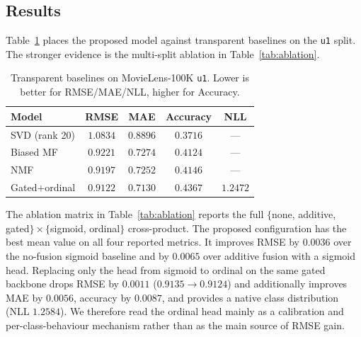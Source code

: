 \documentclass[a4paper]{article} %
\begin{document}
\subsection{Results}
Table~\ref{tab:baselines} places the proposed model against transparent
baselines on the \texttt{u1} split. The stronger evidence is the multi-split
ablation in Table~\ref{tab:ablation}.

\begin{table}[ht]
\centering
\caption{Transparent baselines on MovieLens-100K \texttt{u1}. Lower is better
for RMSE/MAE/NLL, higher for Accuracy.}
\label{tab:baselines}
\begin{tabular}{lcccc}
\toprule
Model & RMSE & MAE & Accuracy & NLL \\
\midrule
SVD (rank 20) & $1.0834$ & $0.8896$ & $0.3716$ & --- \\
Biased MF & $0.9221$ & $0.7274$ & $0.4124$ & --- \\
NMF & $0.9197$ & $0.7252$ & $0.4146$ & --- \\
Gated$+$ordinal & $\mathbf{0.9122}$ & $\mathbf{0.7130}$ & $\mathbf{0.4367}$ & $\mathbf{1.2472}$ \\
\bottomrule
\end{tabular}
\end{table}

The ablation matrix in Table~\ref{tab:ablation} reports the full
$\{$none, additive, gated$\}\times\{$sigmoid, ordinal$\}$ cross-product. The
proposed configuration has the best mean value on all four reported metrics. It
improves RMSE by $0.0036$ over the no-fusion sigmoid baseline and by $0.0065$
over additive fusion with a sigmoid head. Replacing only the head from sigmoid
to ordinal on the same gated backbone drops RMSE by $0.0011$ ($0.9135\to0.9124$)
and additionally improves MAE by $0.0056$, accuracy by $0.0087$, and provides
a native class distribution (NLL $1.2584$). We therefore read the ordinal head
mainly as a calibration and per-class-behaviour mechanism rather than as the
main source of RMSE gain.
\end{document}
